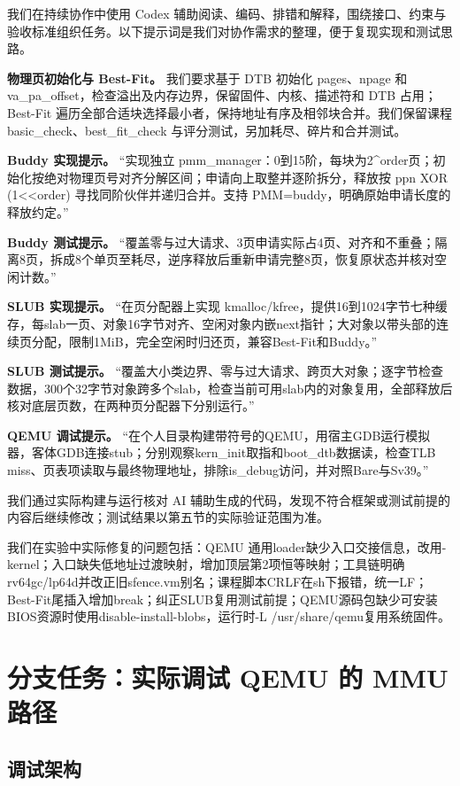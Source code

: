 \documentclass[UTF8,a4paper,10pt]{ctexart}
\begin{document}
我们在持续协作中使用 Codex 辅助阅读、编码、排错和解释，围绕接口、约束与验收标准组织任务。以下提示词是我们对协作需求的整理，便于复现实现和测试思路。


\textbf{物理页初始化与 Best-Fit。} 我们要求基于 DTB 初始化 pages、npage 和 va\_pa\_offset，检查溢出及内存边界，保留固件、内核、描述符和 DTB 占用；Best-Fit 遍历全部合适块选择最小者，保持地址有序及相邻块合并。我们保留课程 basic\_check、best\_fit\_check 与评分测试，另加耗尽、碎片和合并测试。


\textbf{Buddy 实现提示。} “实现独立 pmm\_manager：0到15阶，每块为2\textasciicircum{}order页；初始化按绝对物理页号对齐分解区间；申请向上取整并逐阶拆分，释放按 ppn XOR (1<<order) 寻找同阶伙伴并递归合并。支持 PMM=buddy，明确原始申请长度的释放约定。”


\textbf{Buddy 测试提示。} “覆盖零与过大请求、3页申请实际占4页、对齐和不重叠；隔离8页，拆成8个单页至耗尽，逆序释放后重新申请完整8页，恢复原状态并核对空闲计数。”


\textbf{SLUB 实现提示。} “在页分配器上实现 kmalloc/kfree，提供16到1024字节七种缓存，每slab一页、对象16字节对齐、空闲对象内嵌next指针；大对象以带头部的连续页分配，限制1MiB，完全空闲时归还页，兼容Best-Fit和Buddy。”


\textbf{SLUB 测试提示。} “覆盖大小类边界、零与过大请求、跨页大对象；逐字节检查数据，300个32字节对象跨多个slab，检查当前可用slab内的对象复用，全部释放后核对底层页数，在两种页分配器下分别运行。”


\textbf{QEMU 调试提示。} “在个人目录构建带符号的QEMU，用宿主GDB运行模拟器，客体GDB连接stub；分别观察kern\_init取指和boot\_dtb数据读，检查TLB miss、页表项读取与最终物理地址，排除is\_debug访问，并对照Bare与Sv39。”


我们通过实际构建与运行核对 AI 辅助生成的代码，发现不符合框架或测试前提的内容后继续修改；测试结果以第五节的实际验证范围为准。


我们在实验中实际修复的问题包括：QEMU 通用loader缺少入口交接信息，改用-kernel；入口缺失低地址过渡映射，增加顶层第2项恒等映射；工具链明确rv64gc/lp64d并改正旧sfence.vm别名；课程脚本CRLF在sh下报错，统一LF；Best-Fit尾插入增加break；纠正SLUB复用测试前提；QEMU源码包缺少可安装BIOS资源时使用disable-install-blobs，运行时-L /usr/share/qemu复用系统固件。


\section{分支任务：实际调试 QEMU 的 MMU 路径}

\subsection{调试架构}
\end{document}
